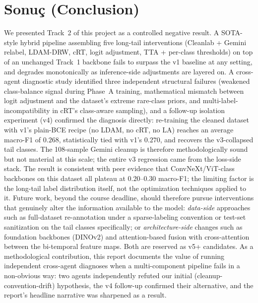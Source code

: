 \documentclass[journal]{IEEEtran}
\begin{document}
\section{Sonu\c{c} (Conclusion)}\label{sec:sonuc}

We presented Track~2 of this project as a controlled negative result. A SOTA-style hybrid pipeline assembling five long-tail interventions (Cleanlab + Gemini relabel, LDAM-DRW, cRT, logit adjustment, TTA + per-class thresholds) on top of an unchanged Track~1 backbone fails to surpass the v1 baseline at any setting, and degrades monotonically as inference-side adjustments are layered on. A cross-agent diagnostic study identified three independent structural failures (weakened class-balance signal during Phase~A training, mathematical mismatch between logit adjustment and the dataset's extreme rare-class priors, and multi-label-incompatibility in cRT's class-aware sampling), and a follow-up isolation experiment (v4) confirmed the diagnosis directly: re-training the cleaned dataset with v1's plain-BCE recipe (no LDAM, no cRT, no LA) reaches an average macro-F1 of $0.268$, statistically tied with v1's $0.270$, and recovers the v3-collapsed tail classes. The 108-sample Gemini cleanup is therefore methodologically sound but not material at this scale; the entire v3 regression came from the loss-side stack. The result is consistent with peer evidence that ConvNeXt/ViT-class backbones on this dataset all plateau at $0.20$--$0.30$ macro-F1; the limiting factor is the long-tail label distribution itself, not the optimization techniques applied to it. Future work, beyond the course deadline, should therefore pursue interventions that genuinely alter the information available to the model: \emph{data-side} approaches such as full-dataset re-annotation under a sparse-labeling convention or test-set sanitization on the tail classes specifically; or \emph{architecture-side} changes such as foundation backbones (DINOv2) and attention-based fusion with cross-attention between the bi-temporal feature maps. Both are reserved as v5+ candidates. As a methodological contribution, this report documents the value of running independent cross-agent diagnoses when a multi-component pipeline fails in a non-obvious way: two agents independently refuted our initial (cleanup-convention-drift) hypothesis, the v4 follow-up confirmed their alternative, and the report's headline narrative was sharpened as a result.

\end{document}
